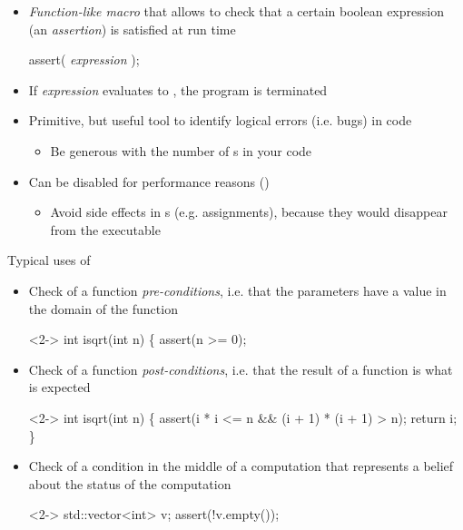 

\begin{frame}[fragile]{}

  \begin{itemize}
  \item \textit{Function-like macro} that allows to check that a certain boolean
    expression (an \textit{assertion}) is satisfied at run time
    \begin{codeblock}
assert( \textit{expression} );\end{codeblock}
  \item If \textit{expression} evaluates to , the program is terminated
  \item<2-> Primitive, but useful tool to identify logical errors (i.e. bugs) in
    code
    \begin{itemize}
    \item Be generous with the number of s in your code
    \end{itemize}
  \item<3-> Can be disabled for performance reasons ()
    \begin{itemize}
    \item Avoid side effects in s (e.g. assignments), because they
      would disappear from the executable
    \end{itemize}

  \end{itemize}
\end{frame}

\begin{frame}[fragile]{Typical uses of }

  \begin{itemize}
  \item<1-> Check of a function \textit{pre-conditions}, i.e. that the
    parameters have a value in the domain of the function

    \begin{codeblock}<2->{
int isqrt(int n) \{
  assert(n >= 0);
  \ddd}\end{codeblock}

  \item<2-> Check of a function \textit{post-conditions}, i.e. that the result of
    a function is what is expected

    \begin{codeblock}<2->{
int isqrt(int n) \{
  \ddd
  assert(i * i <= n && (i + 1) * (i + 1) > n);
  return i;
\}}\end{codeblock}

  \item<3-> Check of a condition in the middle of a computation that represents a
    belief about the status of the computation

    \begin{codeblock}<2->{
std::vector<int> v;
\ddd 
assert(!v.empty());
\ddd}\end{codeblock}

  \end{itemize}

\end{frame}

